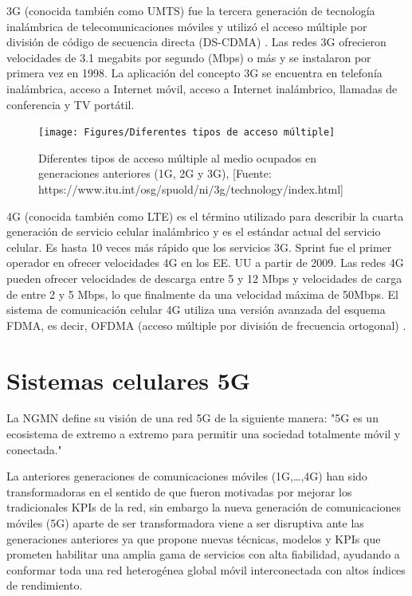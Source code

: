 3G (conocida también como UMTS) fue la tercera generación de tecnología inalámbrica de telecomunicaciones móviles y utilizó el acceso múltiple por división de código de secuencia directa (DS-CDMA) \parencite{Nair2018}. Las redes 3G ofrecieron velocidades de 3.1 megabits por segundo (Mbps) o más y se instalaron por primera vez en 1998. La aplicación del concepto 3G se encuentra en telefonía inalámbrica, acceso a Internet móvil, acceso a Internet inalámbrico, llamadas de conferencia y TV portátil.\newline

\begin{figure}[th]
\centering
\texttt{[image: Figures/Diferentes tipos de acceso múltiple]}
\decoRule
\caption[Diferentes tipos de acceso múltiple al medio ocupados en generaciones anteriores (1G, 2G y 3G)]{Diferentes tipos de acceso múltiple al medio ocupados en generaciones anteriores (1G, 2G y 3G), [Fuente: https://www.itu.int/osg/spuold/ni/3g/technology/index.html]}
\label{fig:MAs}
\end{figure}

4G (conocida también como LTE) es el término utilizado para describir la cuarta generación de servicio celular inalámbrico y es el estándar actual del servicio celular. Es hasta 10 veces más rápido que los servicios 3G. Sprint fue el primer operador en ofrecer velocidades 4G en los EE. UU a partir de 2009. Las redes 4G pueden ofrecer velocidades de descarga entre 5 y 12 Mbps y velocidades de carga de entre 2 y 5 Mbps, lo que finalmente da una velocidad máxima de 50Mbps. El sistema de comunicación celular 4G utiliza una versión avanzada del esquema FDMA, es decir, OFDMA (acceso múltiple por división de frecuencia ortogonal) \parencite{Nair2018}.


\section{Sistemas celulares 5G}

La NGMN define su visión de una red 5G de la siguiente manera: "5G es un ecosistema de extremo a extremo para permitir una sociedad totalmente móvil y conectada."\newline

La anteriores generaciones de comunicaciones móviles (1G,{\dots},4G) han sido transformadoras en el sentido de que fueron motivadas por mejorar los tradicionales KPIs de la red, sin embargo la nueva generación de comunicaciones móviles (5G) aparte de ser transformadora viene a ser disruptiva ante las generaciones anteriores ya que propone nuevas técnicas, modelos y KPIs que prometen habilitar una amplia gama de servicios con alta fiabilidad, ayudando a conformar toda una red heterogénea global móvil interconectada con altos índices de rendimiento.\newline

